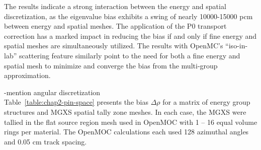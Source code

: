 The results indicate a strong interaction between the energy and spatial discretization, as the eigenvalue bias exhibits a swing of nearly 10000-15000 pcm between energy and spatial meshes. The application of the P0 transport correction has a marked impact in reducing the bias if and only if fine energy and spatial meshes are simultaneously utilized. The results with OpenMC's ``iso-in-lab'' scattering feature similarly point to the need for both a fine energy and spatial mesh to minimize and converge the bias from the multi-group approximation.

-mention angular discretization \\

Table~\ref{table:chap2-pin-space} presents the bias $\Delta\rho$ for a matrix of energy group structures and \ac{MGXS} spatial tally zone meshes. In each case, the \ac{MGXS} were tallied in the flat source region mesh used in OpenMOC with 1 -- 16 equal volume rings per material. The OpenMOC calculations each used 128 azimuthal angles and 0.05 cm track spacing.

